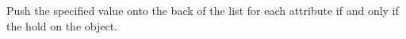 Push the specified value onto the back of the list for each attribute if and
only if the  hold on the object.



